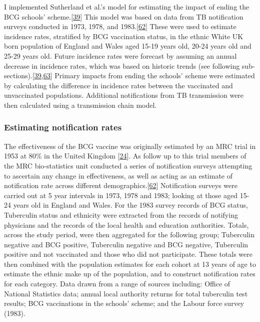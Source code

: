 \documentclass[11pt,twoside]{bristolthesis}
\begin{document}
  I implemented Sutherland et al.'s model for estimating the impact of ending the BCG schools' scheme.{[}\protect\hyperlink{ref-Sutherland1989}{39}{]} This model was based on data from TB notification surveys conducted in 1973, 1978, and 1983.{[}\protect\hyperlink{ref-Sutherland1987a}{62}{]} These were used to estimate incidence rates, stratified by BCG vaccination status, in the ethnic White UK born population of England and Wales aged 15-19 years old, 20-24 years old and 25-29 years old. Future incidence rates were forecast by assuming an annual decrease in incidence rates, which was based on historic trends (see following sub-sections).{[}\protect\hyperlink{ref-Sutherland1989}{39},\protect\hyperlink{ref-Springett1988}{63}{]} Primary impacts from ending the schools' scheme were estimated by calculating the difference in incidence rates between the vaccinated and unvaccinated populations. Additional notifications from TB transmission were then calculated using a transmission chain model.
  
  \hypertarget{estimating-notification-rates}{%
  \subsubsection{Estimating notification rates}\label{estimating-notification-rates}}
  
  The effectiveness of the BCG vaccine was originally estimated by an MRC trial in 1953 at 80\% in the United Kingdom {[}\protect\hyperlink{ref-Hart1972}{24}{]}. As follow up to this trial members of the MRC bio-statistics unit conducted a series of notification surveys attempting to ascertain any change in effectiveness, as well as acting as an estimate of notification rate across different demographics.{[}\protect\hyperlink{ref-Sutherland1987a}{62}{]} Notification surveys were carried out at 5 year intervals in 1973, 1978 and 1983; looking at those aged 15-24 years old in England and Wales. For the 1983 survey records of BCG status, Tuberculin status and ethnicity were extracted from the records of notifying physicians and the records of the local health and education authorities. Totals, across the study period, were then aggregated for the following group; Tuberculin negative and BCG positive, Tuberculin negative and BCG negative, Tuberculin positive and not vaccinated and those who did not participate. These totals were then combined with the population estimates for each cohort at 13 years of age to estimate the ethnic make up of the population, and to construct notification rates for each category. Data drawn from a range of sources including: Office of National Statistics data; annual local authority returns for total tuberculin test results; BCG vaccinations in the schools' scheme; and the Labour force survey (1983).
  
\end{document}

